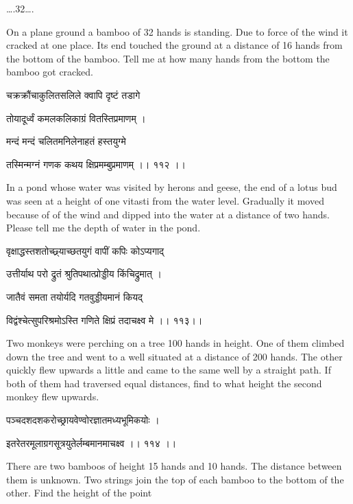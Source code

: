 \documentclass[]{article}
\date{}
\begin{document}
{\ldots{}.32\ldots{}.}

{On a plane ground a bamboo of 32 hands is standing. Due to force of the
wind it cracked at one place. Its end touched the ground at a distance
of 16 hands from the bottom of the bamboo. Tell me at how many hands
from the bottom the bamboo got cracked.}

{चक्रक्रौंचाकुलितसलिले क्वापि दृष्टं तडागे }

{तोयादूर्ध्वं कमलकलिकाग्रं वितस्तिप्रमाणम् । }

{मन्दं मन्दं चलितमनिलेनाहतं हस्तयुग्मे }

{तस्मिन्मग्नं गणक कथय क्षिप्रमम्बुप्रमाणम् ।। ११२ ।। }

{In a pond whose water was visited by herons and geese, the end of a
lotus bud was seen at a height of one vitasti from the water level.
Gradually it moved because of of the wind and dipped into the water at a
distance of two hands. Please tell me the depth of water in the pond.}

{वृक्षाद्धस्तशतोच्छ्र्याच्छतयुगं वापीं कपिः कोऽप्यगाद् }

{उत्तीर्याथ परो द्रुतं श्रुतिपथात्प्रोड्डीय किंचिद्रुमात् । }

{जातैवं समता तयोर्यदि गतवुड्डीयमानं कियद् }

{विद्वंश्चेत्सुपरिश्रमोऽस्ति गणिते क्षिप्रं तदाचक्ष्व मे ।। ११३।। }

{Two monkeys were perching on a tree 100 hands in height. One of them
climbed down the tree and went to a well situated at a distance of 200
hands. The other quickly flew upwards a little and came to the same well
by a straight path. If both of them had traversed equal distances, find
to what height the second monkey flew upwards.}

{पञ्चदशदशकरोच्छ्रायवेण्वोरज्ञातमध्यभूमिकयोः । }

{इतरेतरमूलाग्रगसूत्रयुतेर्लम्बमानमाचक्ष्व ।। ११४ ।। }

{There are two bamboos of height 15 hands and 10 hands. The distance
between them is unknown. Two strings join the top of each bamboo to the
bottom of the other. Find the height of the point\\
}
\end{document}
